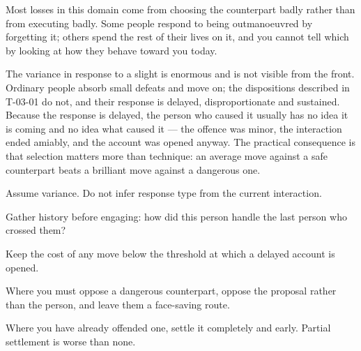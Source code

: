 


\begin{core}
Most losses in this domain come from choosing the counterpart badly rather than from executing badly. Some people respond to being outmanoeuvred by forgetting it; others spend the rest of their lives on it, and you cannot tell which by looking at how they behave toward you today.
\end{core}

\begin{mechanism}
The variance in response to a slight is enormous and is not visible from the front. Ordinary people absorb small defeats and move on; the dispositions described in T-03-01 do not, and their response is delayed, disproportionate and sustained. Because the response is delayed, the person who caused it usually has no idea it is coming and no idea what caused it --- the offence was minor, the interaction ended amiably, and the account was opened anyway. The practical consequence is that selection matters more than technique: an average move against a safe counterpart beats a brilliant move against a dangerous one.
\end{mechanism}

\begin{application}
  \item Assume variance. Do not infer response type from the current interaction.
  \item Gather history before engaging: how did this person handle the last person who crossed them?
  \item Keep the cost of any move below the threshold at which a delayed account is opened.
  \item Where you must oppose a dangerous counterpart, oppose the proposal rather than the person, and leave them a face-saving route.
  \item Where you have already offended one, settle it completely and early. Partial settlement is worse than none.
\end{application}


